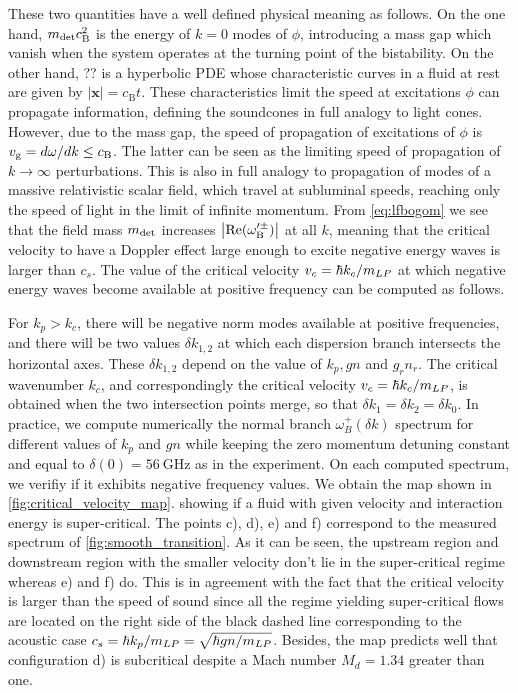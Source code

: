 These two quantities have a well defined physical meaning as follows. 
On the one hand, $m_{\mathrm{det}} c_\mathrm{B}^2$ is the energy of $k=0$ modes of $\phi$, introducing a mass gap which vanish when the system operates at the turning point of the bistability.
On the other hand, ?? is a hyperbolic PDE whose characteristic curves in a fluid at rest are given by $|\pmb{x}|=c_\mathrm{B} t$. These characteristics limit the speed at excitations $\phi$ can propagate information, defining the soundcones in full analogy to light cones. However, due to the mass gap, the speed of propagation of excitations of $\phi$ is $v_{\rm g}=d\omega/dk\leq c_\mathrm{B}$. 
The latter can be seen as the limiting speed of propagation of $k\to\infty$ perturbations. This is also in full analogy to propagation of modes of a massive relativistic scalar field, which travel at subluminal speeds, reaching only the speed of light in the limit of infinite momentum.
From \autoref{eq:lfbogom} we see that the field mass $m_{\mathrm{det}}$ increases $\abs{\mathrm{Re}(\omega_\mathrm{B}^{\prime\pm})}$ at all $k$, meaning that the critical velocity to have a Doppler effect large enough to excite negative energy  waves is larger than $c_s$.
The value of the critical velocity $v_c=\hbar k_c/m_{LP}$ at which negative energy waves become available at positive frequency can be computed as follows. 


For $k_p>k_c$, there will be negative norm modes available at positive frequencies, and there will be two values $\delta k_{1,2}$ at which each dispersion branch intersects the horizontal axes. These $\delta k_{1,2}$ depend on the value of $k_p, gn$ and $g_rn_r$. 
The critical wavenumber $k_c$, and correspondingly the critical velocity $v_c=\hbar k_c/m_{LP}$, is obtained when the two intersection points merge, so that $\delta k_1=\delta k_2=\delta k_0$.
In practice, we compute numerically the  normal branch $\omega_B^+(\delta k)$ spectrum for different values of $k_p$ and $gn$ while keeping the zero momentum detuning constant 
and equal to $\delta(0)=\SI{56}{\giga\hertz}$ as in the experiment. On each computed spectrum, we verifiy if it exhibits negative frequency values. We obtain the map shown in \autoref{fig:critical_velocity_map}.
showing if a fluid with given velocity and interaction energy is super-critical. The points c), d), e) and f) correspond to the measured spectrum of \autoref{fig:smooth_transition}.
As it can be seen, the upstream region and downstream region with the smaller velocity don't lie in the super-critical regime whereas e) and f) do. This is in agreement with the fact that the critical velocity is larger than the speed of sound since 
all the regime yielding super-critical flows are located on the right side of the black dashed line corresponding to the acoustic case $c_s = \hbar k_p/m_{LP}=\sqrt{\hbar gn/m_{LP}}$. Besides, the map predicts well that configuration d) is subcritical despite a 
Mach number $M_d=1.34$ greater than one.

